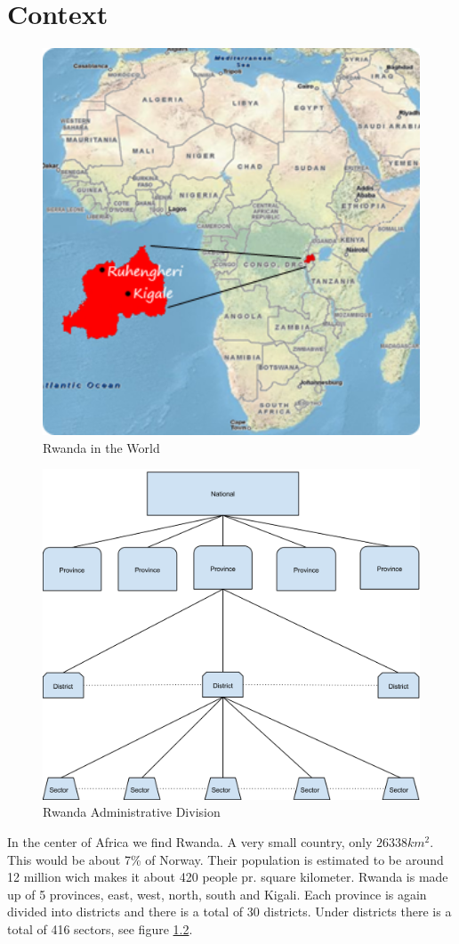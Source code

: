 \chapter{Context}
\begin{figure}
\centering
\includegraphics[width=12cm]{empirical/images/context_map_rwanda}
\caption{Rwanda in the World \cite{14}}
\label{context_map_of_rwanda}
\end{figure}
\begin{figure}
\centering
\includegraphics[width=12cm]{empirical/images/rwanda_administrative_division}
\caption{Rwanda Administrative Division}
\label{rwanda_administrative_division}
\end{figure}
In the center of Africa we find Rwanda. A very small country, only \(26338 km^2\). This would be about 7\% of Norway. 
Their population is estimated to be around 12 million wich makes it about 420 people pr. square kilometer. 
Rwanda is made up of 5 provinces, east, west, north, south and Kigali. 
Each province is again divided into districts and there is a total of 30 districts. Under districts there is a total of 416 sectors\cite{1}, see figure \ref{rwanda_administrative_division}.

